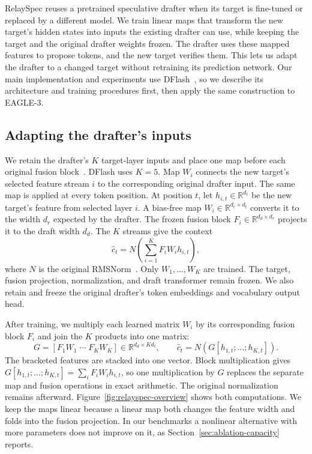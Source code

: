 RelaySpec reuses a pretrained speculative drafter when its target is fine-tuned or replaced by a different model. We train linear maps that transform the new target's hidden states into inputs the existing drafter can use, while keeping the target and the original drafter weights frozen. The drafter uses these mapped features to propose tokens, and the new target verifies them. This lets us adapt the drafter to a changed target without retraining its prediction network. Our main implementation and experiments use DFlash~\citep{chen2026dflash}, so we describe its architecture and training procedures first, then apply the same construction to EAGLE-3.

\subsection{Adapting the drafter's inputs}
\label{sec:method-inputs}
We retain the drafter's $K$ target-layer inputs and place one map before each original fusion block~\citep{chen2026dflash}. DFlash uses $K=5$. Map $W_i$ connects the new target's selected feature stream $i$ to the corresponding original drafter input. The same map is applied at every token position. At position $t$, let $h_{i,t}\in\mathbb R^{d_t}$ be the new target's feature from selected layer $i$. A bias-free map $W_i\in\mathbb R^{d_r\times d_t}$ converts it to the width $d_r$ expected by the drafter. The frozen fusion block $F_i\in\mathbb R^{d_d\times d_r}$ projects it to the draft width $d_d$. The $K$ streams give the context
\begin{equation}
 \widehat c_t=N\!\left(\sum_{i=1}^{K}F_i W_i h_{i,t}\right),
 \label{eq:mapped-context}
\end{equation}
where $N$ is the original RMSNorm~\citep{zhang2019rmsnorm}. Only $W_1,\ldots,W_K$ are trained. The target, fusion projection, normalization, and draft transformer remain frozen. We also retain and freeze the original drafter's token embeddings and vocabulary output head.

After training, we multiply each learned matrix $W_i$ by its corresponding fusion block $F_i$ and join the $K$ products into one matrix:
\begin{equation}
 G=[F_1W_1\;\cdots\;F_KW_K]\in\mathbb R^{d_d\times Kd_t},
 \qquad \widehat c_t=N(G[h_{1,t};\ldots;h_{K,t}]).
 \label{eq:folded-fusion}
\end{equation}
The bracketed features are stacked into one vector. Block multiplication gives $G[h_{1,t};\ldots;h_{K,t}]=\sum_i F_iW_ih_{i,t}$, so one multiplication by $G$ replaces the separate map and fusion operations in exact arithmetic. The original normalization remains afterward. Figure~\ref{fig:relayspec-overview} shows both computations. We keep the maps linear because a linear map both changes the feature width and folds into the fusion projection. In our benchmarks a nonlinear alternative with more parameters does not improve on it, as Section~\ref{sec:ablation-capacity} reports.

